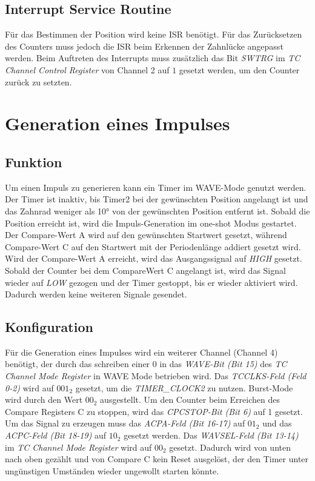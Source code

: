 \documentclass[12pt]{article}
\begin{document}
\subsection{Interrupt Service Routine}
Für das Bestimmen der Position wird keine ISR benötigt. Für das Zurücksetzen des Counters muss jedoch die ISR 
beim Erkennen der Zahnlücke angepasst werden. Beim Auftreten des Interrupts muss zusätzlich das Bit \textit{SWTRG}
im \textit{TC Channel Control Register} von Channel 2 auf $1$ gesetzt werden, um den Counter zurück zu setzten.


\section{Generation eines Impulses}

\subsection{Funktion}
Um einen Impuls zu generieren kann ein Timer im WAVE-Mode genutzt werden. 
Der Timer ist inaktiv, bis Timer2 bei der gewünschten Position angelangt ist und das Zahnrad weniger als
10° von der gewünschten Position entfernt ist.
Sobald die Position erreicht ist, wird die Impuls-Generation im one-shot Modus gestartet.
Der Compare-Wert A wird auf den gewünschten Startwert gesetzt, während Compare-Wert C auf den Startwert mit der Periodenlänge addiert gesetzt wird.
Wird der Compare-Wert A erreicht, wird das Ausgangssignal auf \textit{HIGH} gesetzt.
Sobald der Counter bei dem CompareWert C angelangt ist, wird das Signal wieder auf \textit{LOW} gezogen und der Timer 
gestoppt, bis er wieder aktiviert wird. Dadurch werden keine weiteren Signale gesendet.


\subsection{Konfiguration}
Für die Generation eines Impulses wird ein weiterer Channel (Channel 4) benötigt, der durch das schreiben einer $0$ in das 
\textit{WAVE-Bit (Bit 15)} des \textit{TC Channel Mode Register} in WAVE Mode betrieben wird.
Das \textit{TCCLKS-Feld (Feld 0-2)} wird auf $001_2$ gesetzt, um die \textit{TIMER\_CLOCK2} zu nutzen. 
Burst-Mode wird durch den Wert $00_2$ ausgestellt.
Um den Counter beim Erreichen des Compare Registers C zu stoppen, wird das \textit{CPCSTOP-Bit (Bit 6)} auf 1 gesetzt.
Um das Signal zu erzeugen muss das \textit{ACPA-Feld (Bit 16-17)} auf $01_2$ und das \textit{ACPC-Feld (Bit 18-19)} auf $10_2$ gesetzt werden.
Das \textit{WAVSEL-Feld (Bit 13-14)} im \textit{TC Channel Mode Register} wird auf $00_2$ gesetzt. Dadurch wird von unten nach oben gezählt
und von Compare C kein Reset ausgelöst, der den Timer unter ungünstigen Umständen wieder ungewollt starten könnte.
\end{document}
